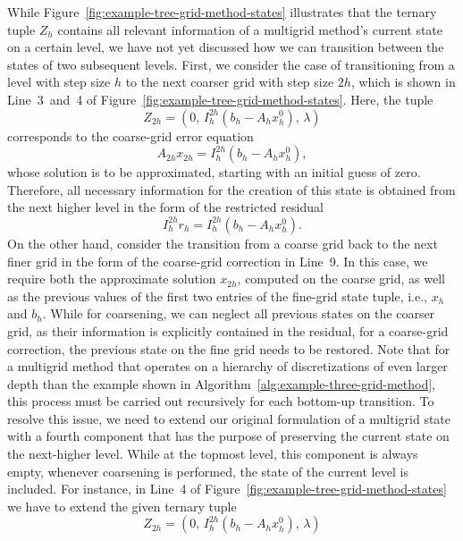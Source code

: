 While Figure~\ref{fig:example-tree-grid-method-states} illustrates that the ternary tuple $Z_h$ contains all relevant information of a multigrid method's current state on a certain level, we have not yet discussed how we can transition between the states of two subsequent levels.
First, we consider the case of transitioning from a level with step size $h$ to the next coarser grid with step size $2h$, which is shown in Line~3~and~4 of Figure~\ref{fig:example-tree-grid-method-states}.
Here, the tuple
\begin{equation*}
	Z_{2h} = (0, \, I_{h}^{2h}(b_{h} - A_h x_{h}^0), \, \lambda)
\end{equation*} 
corresponds to the coarse-grid error equation 
\begin{equation*}
	A_{2h} x_{2h} = I_{h}^{2h}(b_{h} - A_h x_{h}^0),
\end{equation*}
whose solution is to be approximated, starting with an initial guess of zero.
Therefore, all necessary information for the creation of this state is obtained from the next higher level in the form of the restricted residual 
\begin{equation*}
    I_h^{2h} r_h = I_h^{2h} (b_{h} - A_h x_{h}^0).
\end{equation*}
On the other hand, consider the transition from a coarse grid back to the next finer grid in the form of the coarse-grid correction in Line~9.
In this case, we require both the approximate solution $x_{2h}$, computed on the coarse grid, as well as the previous values of the first two entries of the fine-grid state tuple, i.e., $x_h$ and $b_h$.
While for coarsening, we can neglect all previous states on the coarser grid, as their information is explicitly contained in the residual, for a coarse-grid correction, the previous state on the fine grid needs to be restored.
Note that for a multigrid method that operates on a hierarchy of discretizations of even larger depth than the example shown in Algorithm~\ref{alg:example-three-grid-method}, this process must be carried out recursively for each bottom-up transition.
To resolve this issue, we need to extend our original formulation of a multigrid state with a fourth component that has the purpose of preserving the current state on the next-higher level.
While at the topmost level, this component is always empty, whenever coarsening is performed, the state of the current level is included.
For instance, in Line~4 of Figure~\ref{fig:example-tree-grid-method-states} we have to extend the given ternary tuple 
\begin{equation*}
Z_{2h} = (0, \, I_{h}^{2h}(b_{h} - A_h x_{h}^0), \, \lambda)
\end{equation*}
